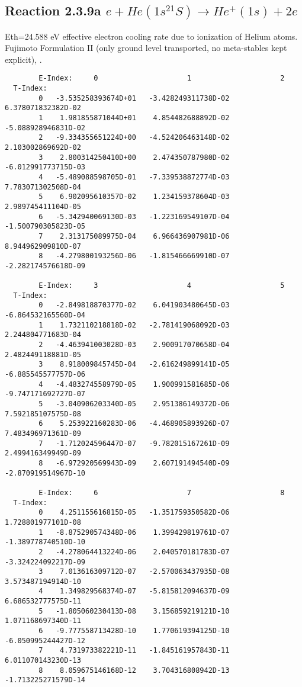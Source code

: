 \documentclass[12pt,dvipdfmx]{article}
\begin{document}
{\subsection{
Reaction 2.3.9a $e + He(1s^21S) \rightarrow He^+(1s) + 2e$
}
Eth=24.588 eV
   effective electron cooling rate due to ionization of Helium atoms.
Fujimoto Formulation II (only ground level transported, no meta-stables
 kept explicit), \cite{kn:Fujimoto}.

\begin{small}\begin{verbatim}
        E-Index:     0                     1                     2
  T-Index:
        0   -3.535258393674D+01   -3.428249311738D-02    6.378071832382D-02
        1    1.981855871044D+01    4.854482688892D-02   -5.088928946831D-02
        2   -9.334355651224D+00   -4.524206463148D-02    2.103002869692D-02
        3    2.800314250410D+00    2.474350787980D-02   -6.012991773715D-03
        4   -5.489088598705D-01   -7.339538872774D-03    7.783071302508D-04
        5    6.902095610357D-02    1.234159378604D-03    2.989745411104D-05
        6   -5.342940069130D-03   -1.223169549107D-04   -1.500790305823D-05
        7    2.313175089975D-04    6.966436907981D-06    8.944962909810D-07
        8   -4.279800193256D-06   -1.815466669910D-07   -2.282174576618D-09

        E-Index:     3                     4                     5
  T-Index:
        0   -2.849818870377D-02    6.041903480645D-03   -6.864532165560D-04
        1    1.732110218818D-02   -2.781419068092D-03    2.244804771683D-04
        2   -4.463941003028D-03    2.900917070658D-04    2.482449118881D-05
        3    8.918009845745D-04   -2.616249899141D-05   -6.885545577757D-06
        4   -4.483274558979D-05    1.900991581685D-06   -9.747171692727D-07
        5   -3.040906203340D-05    2.951386149372D-06    7.592185107575D-08
        6    5.253922160283D-06   -4.468905893926D-07    7.483496971361D-09
        7   -1.712024596447D-07   -9.782015167261D-09    2.499416349949D-09
        8   -6.972920569943D-09    2.607191494540D-09   -2.870919514967D-10

        E-Index:     6                     7                     8
  T-Index:
        0    4.251155616815D-05   -1.351759350582D-06    1.728801977101D-08
        1   -8.875290574348D-06    1.399429819761D-07   -1.389778740510D-10
        2   -4.278064413224D-06    2.040570181783D-07   -3.324224092217D-09
        3    7.013616309712D-07   -2.570063437935D-08    3.573487194914D-10
        4    1.349829568374D-07   -5.815812094637D-09    6.686532777575D-11
        5   -1.805060230413D-08    3.156859219121D-10    1.071168697340D-11
        6   -9.777558713428D-10    1.770619394125D-10   -6.050995244427D-12
        7    4.731973382221D-11   -1.845161957843D-11    6.011070143230D-13
        8    8.059675146168D-12    3.704316808942D-13   -1.713225271579D-14


\end{verbatim}
\end{small}}
\end{document}

